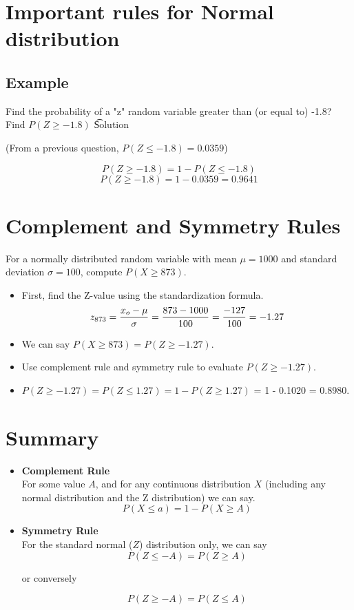 \documentclass[]{report}
\begin{document}
\section{Important rules for Normal distribution}



\subsection{Example }
Find the probability of a "z" random variable greater than (or equal to) -1.8?
Find  $P(Z \geq -1.8)$
\noindent \t{Solution }

(From a previous question, $P(Z \leq -1.8) = 0.0359$)

\[P(Z \geq -1.8) = 1 - P(Z \leq -1.8) \]
\[P(Z \geq -1.8)= 1 - 0.0359 = 0.9641\]


\section{Complement and Symmetry Rules}

For a normally distributed random variable with mean $\mu = 1000$ and standard deviation $\sigma = 100$, compute $P(X \geq 873)$.

\begin{itemize} \item First, find the Z-value using the standardization formula.
\[
z_{873} = {x_o - \mu \over \sigma} = {873 - 1000 \over 100} = {-127 \over 100} = -1.27
\]
\item We can say $P(X \geq 873) = P(Z \geq -1.27)$.
\item Use complement rule and symmetry rule to evaluate  $P(Z \geq -1.27)$.
\item $ P(Z \geq -1.27) = P(Z \leq 1.27) = 1 - P(Z \geq 1.27) $  = 1 - 0.1020 = {0.8980}.
\end{itemize}




\section{Summary}

\begin{itemize}

\item \textbf{Complement Rule}\\
For some value $A$, and for any continuous distribution $X$ (including any normal distribution and the Z distribution) we can say.
\[ P(X \leq a) = 1 - P(X \geq A) \]

\item \textbf{Symmetry Rule}\\
For the standard normal ($Z$) distribution only, we can say
\[ P(Z \leq -A) = P(Z \geq A) \]

or conversely

\[ P(Z \geq -A) = P(Z \leq A) \]

\end{itemize}
\end{document}
